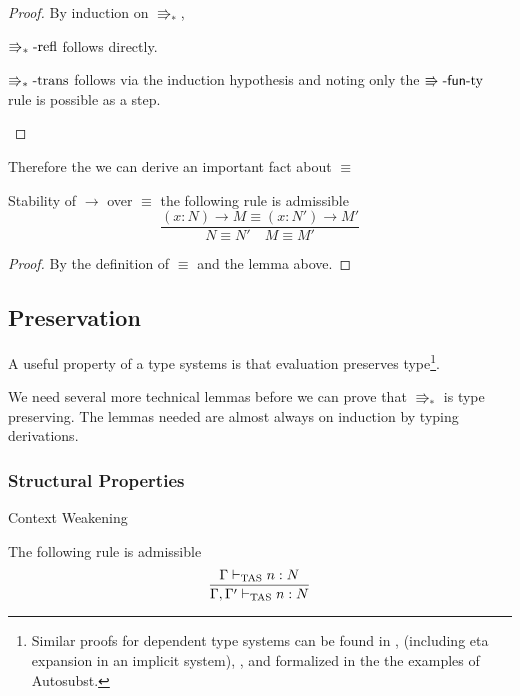 \begin{proof}
By induction on $\Rrightarrow_{\ast}$,
\begin{casenv}
 \item $\operatorname{\Rrightarrow_{\ast}-refl}$ follows directly.
 \item $\operatorname{\Rrightarrow_{\ast}-trans}$ follows via the induction hypothesis and noting only the $\operatorname{\Rrightarrow-\mathsf{fun}-ty}$ rule is possible as a step.
\end{casenv}
\end{proof}
Therefore the we can derive an important fact about $\equiv$
\begin{cor}
Stability of $\rightarrow$ over $\equiv$
the following rule is admissible
\[
\frac{\left(x:N\right)\rightarrow M\equiv\left(x:N'\right)\rightarrow M'}{N\equiv N'\quad M\equiv M'}
\]
\end{cor}
 
\begin{proof}
By the definition of $\equiv$ and the lemma above.
\end{proof}
 
\subsection{Preservation}
 
A useful property of a type systems is that evaluation preserves type\footnote{
  Similar proofs for dependent type systems can be found in \cite[Chapter 3]{luo1994computation}, \cite[Section 3.1]{10.1007/3-540-45413-6_27}(including eta expansion in an implicit system), \cite[appendix]{sjoberg2012irrelevance}, and formalized in the the examples of Autosubst\cite{SchaeferEtAl:2015:Autosubst:-Reasoning}.
  }.
 
We need several more technical lemmas before we can prove that $\Rrightarrow_{\ast}$ is type preserving.
The lemmas needed are almost always on induction by typing derivations.
 
\subsubsection{Structural Properties}
 
\begin{thm}
Context Weakening
 
The following rule is admissible
\[
\frac{\Gamma\vdash_{\mathrm{TAS}} n:N}{\Gamma,\Gamma'\vdash_{\mathrm{TAS}} n:N}
\]
\end{thm}
 

